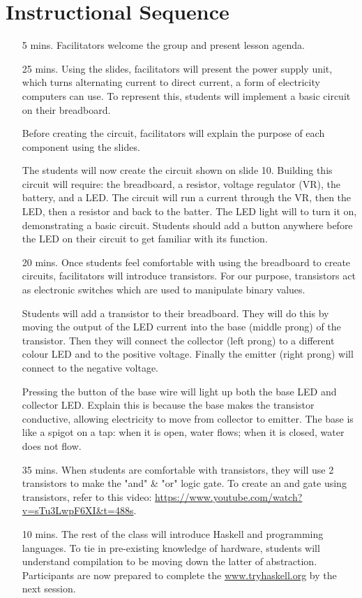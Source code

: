 \documentclass[11pt]{article}
\begin{document}
\section*{Instructional Sequence}

\begin{itemize}
  \item[5 mins.]
    Facilitators welcome the group and present lesson agenda.

  \item[25 mins.]
    Using the slides, facilitators will present the power supply unit, which
    turns alternating current to direct current, a form of electricity computers
    can use. To represent this, students will implement a basic circuit on their
    breadboard.

    Before creating the circuit, facilitators will explain the purpose of each
    component using the slides.

    The students will now create the circuit shown on slide 10.
    Building this circuit will require: the breadboard, a resistor, voltage
    regulator (VR), the battery, and a LED. The circuit will run a current
    through the VR, then the LED, then a resistor and back to the batter.
    The LED light will to turn it on, demonstrating a basic circuit.
    Students should add a button anywhere before the LED on their circuit to
    get familiar with its function.

  \item[20 mins.]
    Once students feel comfortable with using the breadboard to create
    circuits, facilitators will introduce transistors. For our purpose,
    transistors act as electronic switches which are used to manipulate binary
    values.

    Students will add a transistor to their breadboard. They will do this by
    moving the output of the LED current into the base (middle prong) of the
    transistor. Then they will connect the collector (left prong) to a
    different colour LED and to the positive voltage. Finally the emitter
    (right prong) will connect to the negative voltage.

    Pressing the button of the base wire will light up both the base LED and
    collector LED. Explain this is because the base makes the transistor
    conductive, allowing electricity to move from collector to emitter. The
    base is like a spigot on a tap: when it is open, water flows; when it is
    closed, water does not flow.

  \item[35 mins.]
    When students are comfortable with transistors, they will use 2 transistors
    to make the "and" \& "or" logic gate. To create an and gate using
    transistors, refer to this video:
    \url{https://www.youtube.com/watch?v=sTu3LwpF6XI&t=488s}.

  \item[10 mins.]
    The rest of the class will introduce Haskell and programming languages. To
    tie in pre-existing knowledge of hardware, students will understand
    compilation to be moving down the latter of abstraction. Participants are
    now prepared to complete the \url{www.tryhaskell.org} by the next session.
\end{itemize}
\end{document}
